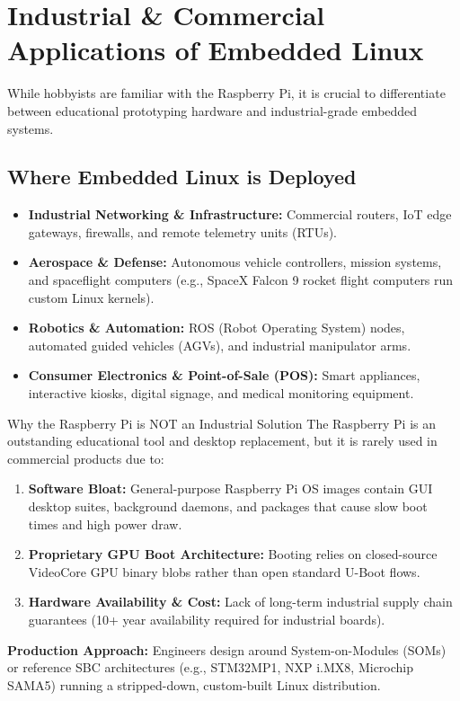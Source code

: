 \section{Industrial \& Commercial Applications of Embedded Linux}

While hobbyists are familiar with the Raspberry Pi, it is crucial to differentiate between educational prototyping hardware and industrial-grade embedded systems.

\subsection{Where Embedded Linux is Deployed}
\begin{itemize}[leftmargin=*]
    \item \textbf{Industrial Networking \& Infrastructure:} Commercial routers, IoT edge gateways, firewalls, and remote telemetry units (RTUs).
    \item \textbf{Aerospace \& Defense:} Autonomous vehicle controllers, mission systems, and spaceflight computers (e.g., SpaceX Falcon 9 rocket flight computers run custom Linux kernels).
    \item \textbf{Robotics \& Automation:} ROS (Robot Operating System) nodes, automated guided vehicles (AGVs), and industrial manipulator arms.
    \item \textbf{Consumer Electronics \& Point-of-Sale (POS):} Smart appliances, interactive kiosks, digital signage, and medical monitoring equipment.
\end{itemize}

\begin{warningbox}{Why the Raspberry Pi is NOT an Industrial Solution}
The Raspberry Pi is an outstanding educational tool and desktop replacement, but it is rarely used in commercial products due to:
\begin{enumerate}[leftmargin=*]
    \item \textbf{Software Bloat:} General-purpose Raspberry Pi OS images contain GUI desktop suites, background daemons, and packages that cause slow boot times and high power draw.
    \item \textbf{Proprietary GPU Boot Architecture:} Booting relies on closed-source VideoCore GPU binary blobs rather than open standard U-Boot flows.
    \item \textbf{Hardware Availability \& Cost:} Lack of long-term industrial supply chain guarantees (10+ year availability required for industrial boards).
\end{enumerate}
\textbf{Production Approach:} Engineers design around System-on-Modules (SOMs) or reference SBC architectures (e.g., STM32MP1, NXP i.MX8, Microchip SAMA5) running a stripped-down, custom-built Linux distribution.
\end{warningbox}
